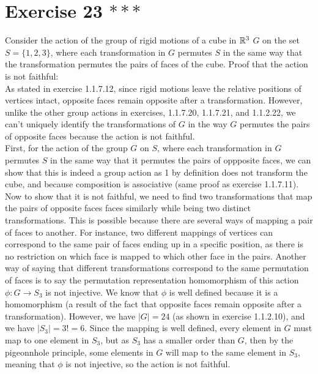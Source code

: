 \documentclass{article}
\begin{document}
    
    \section*{Exercise 23 $***$}
    Consider the action of the group of rigid motions of a cube in $\mathbb{R}^3$
    $G$ on the set $S = \{1, 2, 3\}$,
    where each transformation in $G$ permutes $S$ in the same way that
    the transformation permutes the pairs of faces of the cube.
    Proof that the action is not faithful: \\
    As stated in exercise 1.1.7.12,
    since rigid motions leave the relative positions of vertices intact,
    opposite faces remain opposite after a transformation.
    However, unlike the other group actions in exercises, 1.1.7.20, 1.1.7.21,
    and 1.1.2.22, we can't uniquely identify the transformations of $G$
    in the way $G$ permutes the pairs of opposite faces
    because the action is not faithful. \\
    First, for the action of the group $G$ on $S$,
    where each transformation in $G$ permutes $S$ in the same way that
    it permutes the pairs of oppposite faces,
    we can show that this is indeed a group action
    as 1 by definition does not transform the cube,
    and because composition is associative
    (same proof as exercise 1.1.7.11). \\
    Now to show that it is not faithful,
    we need to find two transformations that map the pairs of opposite faces
    faces similarly while being two distinct transformations.
    This is possible because there are several ways of mapping a
    pair of faces to another.
    For instance, two different mappings of vertices can correspond to
    the same pair of faces ending up in a specific position,
    as there is no restriction on which face is mapped to which other
    face in the pairs.
    Another way of saying that different transformations correspond to the
    same permutation of faces is to say the permutation representation
    homomorphism of this action $\phi: G \to S_3$ is not injective.
    We know that $\phi$ is well defined because it is a homomorphism
    (a result of the fact that opposite faces remain opposite after a 
    transformation).
    However, we have $|G| = 24$ (as shown in exercise 1.1.2.10),
    and we have $|S_3| = 3! = 6$. 
    Since the mapping is well defined, every element in $G$ must map
    to one element in $S_3$,
    but as $S_3$ has a smaller order than $G$,
    then by the pigeonnhole principle, 
    some elements in $G$ will map to the same element in $S_3$,
    meaning that $\phi$ is not injective,
    so the action is not faithful. \\
\end{document}
